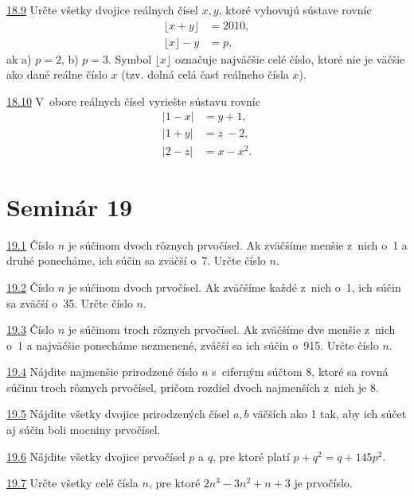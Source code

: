 \noindent \ul{18.9}  Určte všetky dvojice reálnych čísel $x, y$, ktoré vyhovujú sústave rovníc
\begin{align*}
\lfloor x + y\rfloor &= 2 010,\\
\lfloor x\rfloor - y &= p,
\end{align*}
ak a) $p = 2$, b) $p = 3$.
Symbol $\lfloor x \rfloor$ označuje najväčšie celé číslo, ktoré nie je väčšie ako dané reálne číslo $x$ (tzv. dolná celá časť reálneho čísla $x$).




\noindent \ul{18.10} 
V~obore reálnych čísel vyriešte sústavu rovníc
\begin{align*}
|1 - x| &= y + 1,\\
|1 + y| &= z~- 2,\\
|2 - z| &= x - x^2.
\end{align*}



\section*{Seminár 19}

\noindent \ul{19.1}  Číslo $n$ je súčinom dvoch rôznych prvočísel. Ak zväčšíme menšie z~nich o~1 a druhé ponecháme, ich súčin sa zväčší o~7. Určte číslo $n$.




\noindent \ul{19.2}  Číslo $n$ je súčinom dvoch prvočísel. Ak zväčšíme každé z~nich o~1, ich súčin sa zväčší o~35. Určte číslo $n$.




\noindent \ul{19.3} 
Číslo $n$ je súčinom troch rôznych prvočísel. Ak zväčšíme dve menšie z~nich o~1 a najväčšie ponecháme nezmenené, zväčší sa ich súčin o~915. Určte číslo $n$.




\noindent \ul{19.4} 
Nájdite najmenšie prirodzené číslo $n$ s~ciferným súčtom 8, ktoré sa rovná súčinu troch rôznych prvočísel, pričom rozdiel dvoch najmenších z~nich je 8.




\noindent \ul{19.5} 
Nájdite všetky dvojice prirodzených čísel $a, b$ väčších ako 1 tak, aby ich súčet aj súčin boli mocniny prvočísel.




\noindent \ul{19.6}  Nájdite všetky dvojice prvočísel $p$ a $q$, pre ktoré platí $p + q^2= q + 145p^2$.




\noindent \ul{19.7} 
Určte všetky celé čísla $n$, pre ktoré $2n^3 -3n^2 +n+3$ je prvočíslo.




